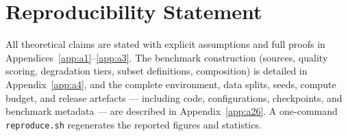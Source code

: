 \documentclass{article}
\begin{document}
\section*{Reproducibility Statement}\label{sec:repro}
All theoretical claims are stated with explicit assumptions and full proofs in
Appendices~\ref{app:a1}--\ref{app:a3}. The benchmark construction (sources, quality scoring,
degradation tiers, subset definitions, composition) is detailed in Appendix~\ref{app:a4}, and the
complete environment, data splits, seeds, compute budget, and release artefacts --- including code,
configurations, checkpoints, and benchmark metadata --- are described in Appendix~\ref{app:a26}. A
one-command \texttt{reproduce.sh} regenerates the reported figures and statistics.

\appendix



















\end{document}
